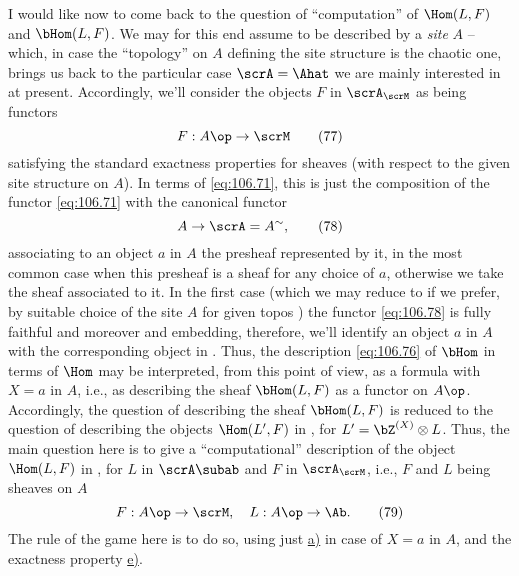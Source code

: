 I would like now to come back to the question of ``computation'' of
$\Hom(L,F)$ and $\bHom(L,F)$. We may for this end assume \scrA{} to be
described by a \emph{site} $A$ -- which, in case the ``topology'' on
$A$ defining the site structure is the chaotic one, brings us back to
the particular case $\scrA=\Ahat$ we are mainly interested in at
present. Accordingly, we'll consider the objects $F$ in $\scrA_\scrM$
as being functors
\begin{equation}
  \label{eq:106.77}
  F:A\op\to\scrM\tag{77}
\end{equation}
satisfying the standard exactness properties for sheaves (with respect
to the given site structure on $A$). In terms of \eqref{eq:106.71},
this is just the composition of the functor \eqref{eq:106.71} with the
canonical functor
\begin{equation}
  \label{eq:106.78}
  A\to\scrA=A^{\sim},\tag{78}
\end{equation}
associating to an object $a$ in $A$ the presheaf represented by it, in
the most common case when this presheaf is a sheaf for any
choice of $a$, otherwise we take the sheaf associated to it. In the
first case (which we may reduce to if we prefer, by suitable choice of
the site $A$ for given topos \scrA) the functor \eqref{eq:106.78} is
fully faithful and moreover and embedding, therefore, we'll identify
an object $a$ in $A$ with the corresponding object in \scrA. Thus, the
description \eqref{eq:106.76} of $\bHom$ in terms of $\Hom$ may be
interpreted, from this point of view, as a formula with $X=a$ in $A$,
i.e., as describing the sheaf $\bHom(L,F)$ as a functor on
$A\op$. Accordingly, the question of describing the sheaf $\bHom(L,F)$
is reduced to the question of describing the objects $\Hom(L',F)$ in
\scrM, for $L'=\bZ^{(X)}\otimes L$. Thus, the main question here is to
give a ``computational'' description of the object $\Hom(L,F)$ in
\scrM, for $L$ in $\scrA\subab$ and $F$ in $\scrA_\scrM$, i.e., $F$
and $L$ being sheaves on $A$
\begin{equation}
  \label{eq:106.79}
  F:A\op\to\scrM,\quad
  L:A\op\to\Ab.\tag{79}
\end{equation}
The rule of the game here is to do so, using just
\hyperref[eq:106.75]{a)} in case of $X=a$ in $A$, and the exactness
property \hyperref[eq:106.75]{e)}.


